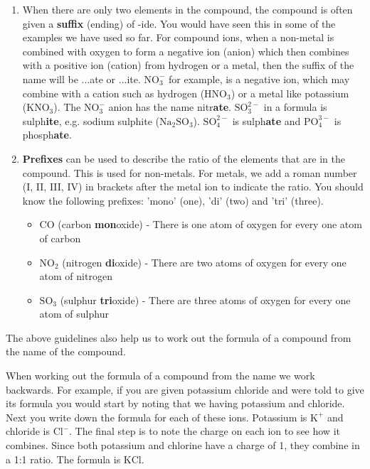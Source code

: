 \begin{enumerate}[noitemsep, label=\textbf{\arabic*}. ]
\begin{table}
\begin{center}
 \end{center}
\caption{Table of anions}
\label{tab:anions}
\end{table}

    \par
  \label{m38708*uid42}\item When there are only two elements in the compound, the compound is often given a \textbf{suffix} (ending) of -ide. You would have seen this in some of the examples we have used so far. For compound ions, when a non-metal is combined with oxygen to form a negative ion (anion) which then combines with a positive ion (cation) from hydrogen or a metal, then the suffix of the name will be ...ate or ...ite. $\mathrm{NO}_{3}^{-}$ for example, is a negative ion, which may combine with a cation such as hydrogen ($\mathrm{HNO}{}_{3}$) or a metal like potassium (KNO$_\text{3}$). The $\mathrm{NO}_{3}^{-}$ anion has the name nitr\textbf{ate}. $\mathrm{SO}_{3}^{2-}$ in a formula is sulph\textbf{ite}, e.g. sodium sulphite ($\mathrm{Na}{}_{2}\mathrm{SO}{}_{3}$).\newline
     $\mathrm{SO}_{4}^{2-}$ is sulph\textbf{ate} and $\mathrm{PO}_{4}^{3-}$ is phosph\textbf{ate}.
\label{m38708*uid43}\item \textbf{Prefixes} can be used to describe the ratio of the elements that are in the compound. This is used for non-metals. For metals, we add a roman number (I, II, III, IV) in brackets after the metal ion to indicate the ratio. You should know the following prefixes: 'mono' (one), 'di' (two) and 'tri' (three).
\label{m38708*id64977}\begin{itemize}[noitemsep]
            \label{m38708*uid44}\item $\mathrm{CO}$ (carbon \textbf{mon}oxide) - There is one atom of oxygen for every one atom of carbon
\label{m38708*uid45}\item $\mathrm{NO}{}_{2}$ (nitrogen \textbf{di}oxide) - There are two atoms of oxygen for every one atom of nitrogen
\label{m38708*uid46}\item $\mathrm{SO}{}_{3}$ (sulphur \textbf{tri}oxide) - There are three atoms of oxygen for every one atom of sulphur
\end{itemize}
        \end{enumerate}
\label{m38708*id537402}The above guidelines also help us to work out the formula of a compound from the name of the compound.\par 
\label{m38708*eip-178}When working out the formula of a compound from the name we work backwards. For example, if you are given potassium chloride and were told to give its formula you would start by noting that we having potassium and chloride. Next you write down the formula for each of these ions. Potassium is ${\mathrm{K}}^{+}$ and chloride is ${\mathrm{Cl}}^{-}$. The final step is to note the charge on each ion to see how it combines. Since both potassium and chlorine have a charge of 1, they combine in a 1:1 ratio. The formula is $\mathrm{KCl}$.\par \label{m38708*notfhsst!!!underscore!!!id252}
